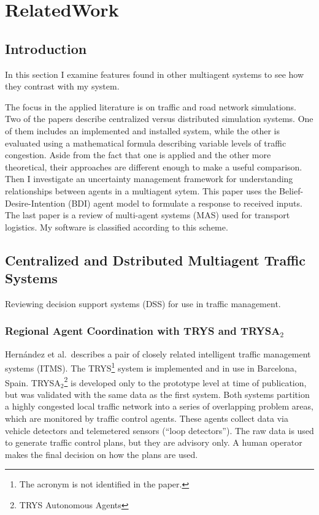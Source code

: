 \documentclass[11pt,letterpaper,onecolumn,twoside,openright,final]{report}
\begin{document}
%


\chapter{RelatedWork}
\section{Introduction}
In this section I examine features found in other multiagent systems to see how they contrast with my system.

The focus in the applied literature is on traffic and road network simulations.
Two of the papers describe centralized versus distributed simulation systems\cite{france2003mso,hernandez2001}.
One of them includes an implemented and installed system, while the other is evaluated using a mathematical formula describing variable levels of traffic congestion.
Aside from the fact that one is applied and the other more theoretical, their approaches are different enough to make a useful comparison.
Then I investigate an uncertainty management framework for understanding relationships between agents in a multiagent sytem\cite{wu2003umf}.
This paper uses the Belief-Desire-Intention (BDI) agent model to formulate a response to received inputs.
The last paper is a review of multi-agent systems (MAS) used for transport logistics\cite{davidsson2005aab}.
My software is classified according to this scheme.

\section[Multiagent Traffic Systems]{Centralized and Dstributed Multiagent Traffic Systems}
Reviewing decision support systems (DSS) for use in traffic management.

\subsection{Regional Agent Coordination with TRYS and TRYSA$_{2}$}
Hern\'{a}ndez et al.\cite{hernandez2001}~describes a pair of closely related intelligent traffic management systems (ITMS).
The TRYS\footnote{The acronym is not identified in the paper.} system is implemented and in use in Barcelona, Spain.
TRYSA$_{2}$\footnote{TRYS Autonomous Agents} is developed only to the prototype level at time of publication, but was validated with the same data as the first system.
Both systems partition a highly congested local traffic network into a series of overlapping problem areas, which are monitored by traffic control agents.
These agents collect data via vehicle detectors and telemetered sensors (``loop detectors'').
The raw data is used to generate traffic control plans, but they are advisory only.
A human operator makes the final decision on how the plans are used.
\end{document}
